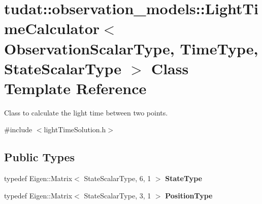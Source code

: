 \hypertarget{classtudat_1_1observation__models_1_1LightTimeCalculator}{}\section{tudat\+:\+:observation\+\_\+models\+:\+:Light\+Time\+Calculator$<$ Observation\+Scalar\+Type, Time\+Type, State\+Scalar\+Type $>$ Class Template Reference}
\label{classtudat_1_1observation__models_1_1LightTimeCalculator}


Class to calculate the light time between two points.  




{\ttfamily \#include $<$light\+Time\+Solution.\+h$>$}

\subsection*{Public Types}
\begin{DoxyCompactItemize}
\item 
typedef Eigen\+::\+Matrix$<$ State\+Scalar\+Type, 6, 1 $>$ {\bfseries State\+Type}\hypertarget{classtudat_1_1observation__models_1_1LightTimeCalculator_a24eaf4926caf8da0081c23ccf605d494}{}\label{classtudat_1_1observation__models_1_1LightTimeCalculator_a24eaf4926caf8da0081c23ccf605d494}

\item 
typedef Eigen\+::\+Matrix$<$ State\+Scalar\+Type, 3, 1 $>$ {\bfseries Position\+Type}\hypertarget{classtudat_1_1observation__models_1_1LightTimeCalculator_a4331a5cf40cb479f7768bf21e08126fa}{}\label{classtudat_1_1observation__models_1_1LightTimeCalculator_a4331a5cf40cb479f7768bf21e08126fa}

\end{DoxyCompactItemize}
